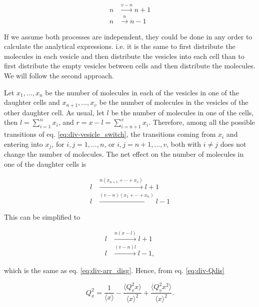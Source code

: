 \begin{equation}
  \label{eq:div-arr_clust}
  \begin{split}
    n &\xrightarrow{v-n} n+1\\
    n &\xrightarrow{n} n-1
  \end{split}
\end{equation}

If we assume both processes are independent, they could be done in any order to calculate the analytical expressions. i.e. it is the same to first distribute the molecules in each vesicle and then distribute the vesicles into each cell than to first distribute the empty vesicles between cells and then distribute the molecules. We will follow the second approach.

Let $x_1,\dotsc,x_n$ be the number of molecules in each of the vesicles in one of the daughter cells and $x_{n+1},\dotsc,x_v$ be the number of molecules in the vesicles of the other daughter cell. As usual, let $l$ be the number of molecules in one of the cells, then $l = \sum_{i=1}^nx_i$, and $r = x-l = \sum_{i=n+1}^vx_i$. Therefore, among all the possible transitions of eq. \eqref{eq:div-vesicle_switch}, the transitions coming from $x_i$ and entering into $x_j$, for $i,j=1,\dotsc,n$, or $i,j=n+1,\dotsc,v$, both with $i\neq j$ does not change the number of molecules. The net effect on the number of molecules in one of the daughter cells is

\begin{equation}
  \begin{split}
    l&\xrightarrow{n(x_{n+1}+\dotsb+x_{v})}l+1\\
    l&\xrightarrow{(v-n)(x_1+\dotsb+x_n)}l-1
  \end{split}
\end{equation}


This can be simplified to

\begin{equation}
  \begin{split}
    l&\xrightarrow{n(x-l)}l+1\\
    l&\xrightarrow{(v-n)l}l-1,
  \end{split}
\end{equation}

which is the same as eq. \eqref{eq:div-arr_disg}. Hence, from eq. \eqref{eq:div-Qdis}

\begin{equation}
  \label{eq:div-clus-Qx1}
  Q_x^2 = \frac{1}{\langle x\rangle} - \frac{\langle Q_v^2x\rangle}{\langle x\rangle^2} + \frac{\langle Q_v^2x^2\rangle}{\langle x\rangle^2}.
\end{equation}

